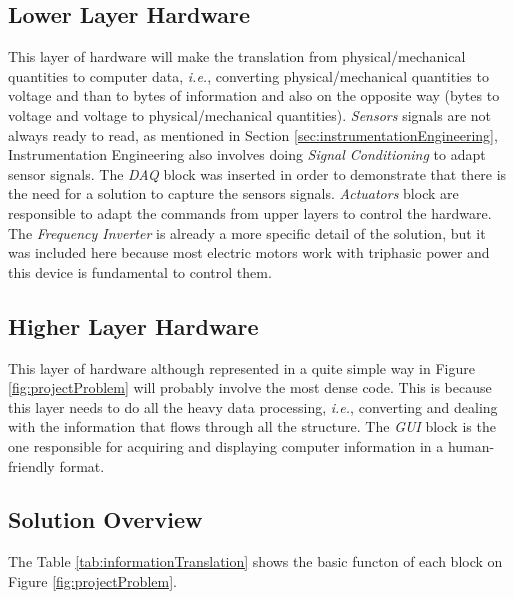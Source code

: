 	\subsection{Lower Layer Hardware}\label{ssec:lowerLayerlHardware}

		This layer of hardware will make the translation from physical/mechanical quantities to computer data, \textit{i.e.}, converting physical/mechanical quantities to voltage and than to bytes of information and also on the opposite way (bytes to voltage and voltage to physical/mechanical quantities). \textit{Sensors} signals are not always ready to read, as mentioned in Section \ref{sec:instrumentationEngineering}, Instrumentation Engineering also involves doing \textit{Signal Conditioning} to adapt sensor signals. The \textit{DAQ} block was inserted in order to demonstrate that there is the need for a solution to capture the sensors signals. \textit{Actuators} block are responsible to adapt the commands from upper layers to control the hardware. The \textit{Frequency Inverter} is already a more specific detail of the solution, but it was included here because most electric motors work with triphasic power and this device is fundamental to control them.

	\subsection{Higher Layer Hardware}\label{ssec:higherLayerlHardware}
	
		This layer of hardware although represented in a quite simple way in Figure \ref{fig:projectProblem} will probably involve the most dense code. This is because this layer needs to do all the heavy data processing, \textit{i.e.}, converting and dealing with the information that flows through all the structure. The \textit{GUI} block is the one responsible for acquiring and displaying computer information in a human-friendly format.

	\subsection{Solution Overview}\label{ssec:solutionOverview}

	The Table \ref{tab:informationTranslation} shows the basic functon of each block on Figure \ref{fig:projectProblem}.

